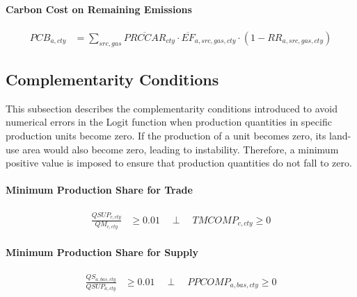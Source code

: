 \paragraph{Carbon Cost on Remaining Emissions}
\begin{align}
  PCB_{a,cty}
  &= \sum_{src,gas}
     \overline{PRCCAR}_{cty}
     \cdot
     \overline{EF}_{a,src,gas,cty}
     \cdot
     (1 - RR_{a,src,gas,cty})
  \tag{PCBEQ}\label{eq:PCBEQ}
\end{align}


\subsection{Complementarity Conditions}

This subsection describes the complementarity conditions introduced to avoid numerical errors in the Logit function when production quantities in specific production units become zero.  
If the production of a unit becomes zero, its land-use area would also become zero, leading to instability.  
Therefore, a minimum positive value is imposed to ensure that production quantities do not fall to zero.

\paragraph{Minimum Production Share for Trade}
\begin{align}
  \frac{QSUP_{c,cty}}{QM_{c,cty}}
  &\ge 0.01
  \quad \perp \quad
  TMCOMP_{c,cty} \ge 0
  \tag{DEPQMEQ}\label{eq:DEPQMEQ}
\end{align}

\paragraph{Minimum Production Share for Supply}
\begin{align}
  \frac{QS_{a,bas,cty}}{QSUP_{a,cty}}
  &\ge 0.01
  \quad \perp \quad
  PPCOMP_{a,bas,cty} \ge 0
  \tag{QSBOUEQ}\label{eq:QSBOUEQ}
\end{align}
